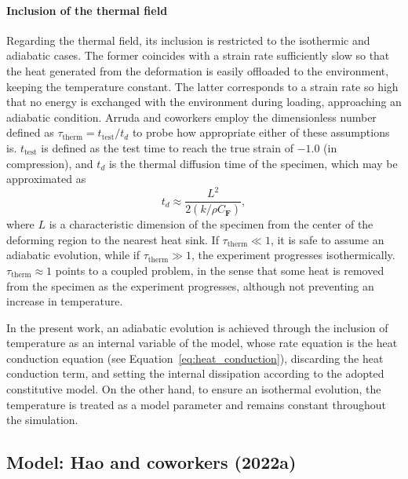 \paragraph{Inclusion of the thermal field}
Regarding the thermal field, its inclusion is restricted to the isothermic and adiabatic cases.
The former coincides with a strain rate sufficiently slow so that the heat generated from the deformation is easily offloaded to the environment, keeping the temperature constant.
The latter corresponds to a strain rate so high that no energy is exchanged with the environment during loading, approaching an adiabatic condition.
Arruda and coworkers \citep{arrudaEffectsStrainRate1995} employ the dimensionless number defined as $\tau_\text{therm} = t_\text{test}/t_d$ to probe how appropriate either of these assumptions is.
$t_\text{test}$ is defined as the test time to reach the true strain of $-1.0$ (in compression), and $t_d$ is the thermal diffusion time of the specimen, which may be approximated as
\begin{equation}
  t_d \approx \frac{L^2}{2(k/\rho C_\mathbf{F})},
\end{equation}
where $L$ is a characteristic dimension of the specimen from the center of the deforming region to the nearest heat sink.
If $\tau_\text{therm} \ll 1$, it is safe to assume an adiabatic evolution, while if $\tau_\text{therm}\gg 1$, the experiment progresses isothermically.
$\tau_\text{therm}\approx 1$ points to  a coupled problem, in the sense that some heat is removed from the specimen as the experiment progresses, although not preventing an increase in temperature.

In the present work, an adiabatic evolution is achieved through the inclusion of temperature as an internal variable of the model, whose rate equation is the heat conduction equation (see Equation~\eqref{eq:heat_conduction}), discarding the heat conduction term, and setting the internal dissipation according to the adopted constitutive model.
On the other hand, to ensure an isothermal evolution, the temperature is treated as a model parameter and remains constant throughout the simulation.

\subsection{Model: Hao and coworkers (2022a)}


